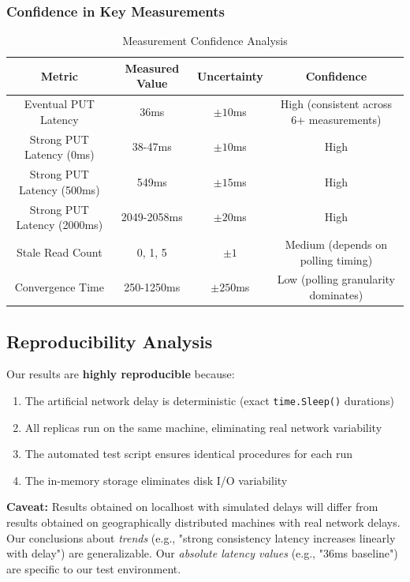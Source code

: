 \documentclass[10pt,a4paper]{article}
\begin{document}
\subsubsection{Confidence in Key Measurements}

\begin{table}[H]
\centering
\caption{Measurement Confidence Analysis}
\begin{tabular}{|c|c|c|c|}
\hline
\textbf{Metric} & \textbf{Measured Value} & \textbf{Uncertainty} & \textbf{Confidence} \\
\hline
Eventual PUT Latency & 36ms & $\pm 10$ms & High (consistent across 6+ measurements) \\
\hline
Strong PUT Latency (0ms) & 38-47ms & $\pm 10$ms & High \\
\hline
Strong PUT Latency (500ms) & 549ms & $\pm 15$ms & High \\
\hline
Strong PUT Latency (2000ms) & 2049-2058ms & $\pm 20$ms & High \\
\hline
Stale Read Count & 0, 1, 5 & $\pm 1$ & Medium (depends on polling timing) \\
\hline
Convergence Time & 250-1250ms & $\pm 250$ms & Low (polling granularity dominates) \\
\hline
\end{tabular}
\end{table}

\subsection{Reproducibility Analysis}

Our results are \textbf{highly reproducible} because:
\begin{enumerate}
    \item The artificial network delay is deterministic (exact \texttt{time.Sleep()} durations)
    \item All replicas run on the same machine, eliminating real network variability
    \item The automated test script ensures identical procedures for each run
    \item The in-memory storage eliminates disk I/O variability
\end{enumerate}

\textbf{Caveat:} Results obtained on localhost with simulated delays will differ from results obtained on geographically distributed machines with real network delays. Our conclusions about \textit{trends} (e.g., "strong consistency latency increases linearly with delay") are generalizable. Our \textit{absolute latency values} (e.g., "36ms baseline") are specific to our test environment.
\end{document}

